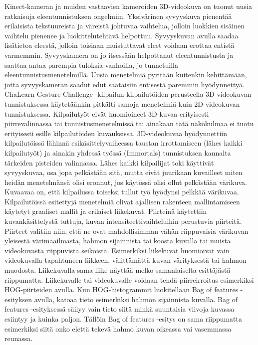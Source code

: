 Kinect-kameran ja muiden vastaavien kameroiden 3D-videokuva on tuonut uusia ratkaisuja eleentunnistuksen ongelmiin. Yksivärinen syvyyskuva pienentää erilaisista tekstuureista
ja väreistä johtuvaa vaihtelua, jolloin luokkien sisäinen vaihtelu pienenee ja luokittelutehtävä helpottuu. Syvyyskuvan avulla
saadaa lisätietoa eleestä, jolloin toisiaan muistuttavat eleet voidaan erottaa entistä varmemmin. Syvyyskamera on jo itsessään
helpottanut eleentunnistusta ja saattaa antaa parempia tuloksia vanhoilla, jo tunnetuilla eleentunnistusmenetelmillä. Uusia menetelmiä
pyritään kuitenkin kehittämään, jotta syvyyskameran saadut edut saataisiin entisestä paremmin hyödynnettyä.\\

ChaLearn Gesture Challenge -kilpailun kilpailutöiden perusteella 3D-videokuvan tunnistuksessa käytetäänkin pitkälti samoja 
menetelmiä kuin 2D-videokuvan tunnistuksessa. Kilpailutyöt eivät huomioineet 3D-kuvaa erityisesti piirrevalinnassa tai tunnistusmenetelmissä 
tai ainakaan tätä näkökulmaa ei tuotu erityisesti esille kilpailutöiden kuvauksissa. 3D-videokuvaa hyödynnettiin kilpailutöissä lähinnä esikäsittelyvaiheessa taustan irrottamiseen 
(lähes kaikki kilpailutyöt) ja ainakin yhdessä työssä (Immortals) tunnistuksen kannalta tärkeiden pisteiden valinnassa. Lähes kaikki kilpailijat 
toki käyttivät syvyyskuvaa, osa jopa pelkästään sitä, mutta eivät juurikaan kuvailleet miten heidän menetelmänsä olisi eronnut, jos käytössä olisi ollut pelkästään värikuva.
Kuvaavaa on, että kilpailussa toiseksi tullut työ hyödynsi pelkkää värikuvaa.\\

Kilpailutöissä esitettyjä menetelmiä olivat ajallisen rakenteen mallintamiseen käytetyt graafiset mallit ja erilaiset liikekuvat. Piirteinä käytettiin 
kuvankäsittelystä tuttuja, kuvan intensiteettivaihteluihin perustuvia piirteitä. Piirteet valitiin niin, että ne ovat mahdollisimman vähän riippuvaisia
 värikuvan yleisestä värimaailmasta, hahmon sijainnista tai koosta kuvalla tai muista videokuvasta riippuvista seikoista. Esimerkiksi liikekuvat huomioivat 
vain videokuvalla tapahtuneen liikkeen, välittämättä kuvan värityksestä tai hahmon muodosta. Liikekuvalla sama liike näyttää melko samanlaiselta esittäjästä 
riippumatta. Liikekuvalle tai videokuvalle voidaan tehdä piirreirroitus esimerkiksi 
HOG-piirteiden avulla. Kun HOG-histogrammit luokitellaan Bag of features -esityksen avulla, katoaa tieto esimerkiksi hahmon sijainnista kuvalla.
Bag of features -esityksessä säilyy vain tieto siitä minkä suuntaisia viivoja kuvassa esiintyy ja kuinka paljon. Tällöin Bag of features -esitys on sama
riippumatta esimerkiksi siitä onko elettä tekevä hahmo kuvan oikeassa vai vasemmassa reunassa.\\

